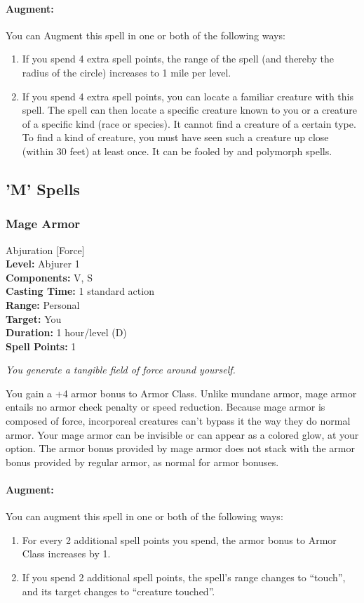 \paragraph{Augment:} You can Augment this spell in one or both of the following ways:
\begin{enumerate}
 \item If you spend 4 extra spell points, the range of the spell (and thereby the radius of the circle) increases to 1 mile per level.
 \item If you spend 4 extra spell points, you can locate a familiar creature with this spell. 
 The spell can then locate a specific creature known to you or a creature of a specific kind (race or species). 
 It cannot find a creature of a certain type. 
 To find a kind of creature, you must have seen such a creature up close (within 30 feet) at least once.
 It can be fooled by  and polymorph spells.
\end{enumerate}
\subsection{'M' Spells}

\subsubsection{Mage Armor}
\label{Spell:MageArmor}
Abjuration [Force]
\\ \textbf{Level:} Abjurer 1
\\ \textbf{Components:} V, S
\\ \textbf{Casting Time:} 1 standard action
\\ \textbf{Range:} Personal
\\ \textbf{Target:} You
\\ \textbf{Duration:} 1 hour/level (D)
\\ \textbf{Spell Points:} 1

\emph{You generate a tangible field of force around yourself.}

You gain a +4 armor bonus to Armor Class. 
Unlike mundane armor, mage armor entails no armor check penalty or speed reduction. 
Because mage armor is composed of force, incorporeal creatures can't bypass it the way they do normal armor.
Your mage armor can be invisible or can appear as a colored glow, at your option.
The armor bonus provided by mage armor does not stack with the armor bonus provided by regular armor, as normal for armor bonuses.

\paragraph{Augment:} You can augment this spell in one or both of the following ways:
\begin{enumerate}
 \item For every 2 additional spell points you spend, the armor bonus to Armor Class increases by 1.
 \item If you spend 2 additional spell points, the spell's range changes to ``touch'', and its target changes to ``creature touched''. 
\end{enumerate}
